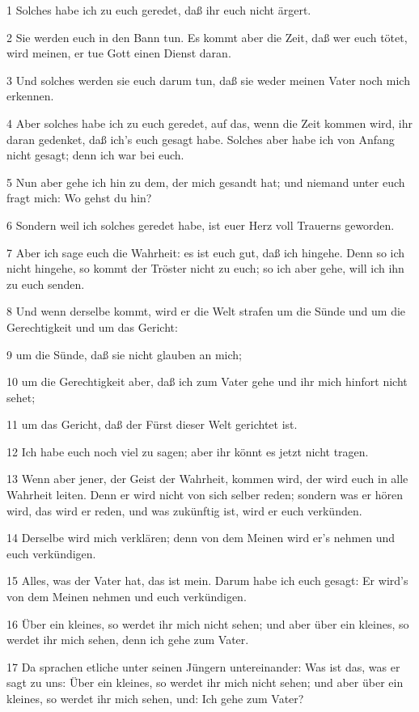 \par 1 Solches habe ich zu euch geredet, daß ihr euch nicht ärgert.
\par 2 Sie werden euch in den Bann tun. Es kommt aber die Zeit, daß wer euch tötet, wird meinen, er tue Gott einen Dienst daran.
\par 3 Und solches werden sie euch darum tun, daß sie weder meinen Vater noch mich erkennen.
\par 4 Aber solches habe ich zu euch geredet, auf das, wenn die Zeit kommen wird, ihr daran gedenket, daß ich's euch gesagt habe. Solches aber habe ich von Anfang nicht gesagt; denn ich war bei euch.
\par 5 Nun aber gehe ich hin zu dem, der mich gesandt hat; und niemand unter euch fragt mich: Wo gehst du hin?
\par 6 Sondern weil ich solches geredet habe, ist euer Herz voll Trauerns geworden.
\par 7 Aber ich sage euch die Wahrheit: es ist euch gut, daß ich hingehe. Denn so ich nicht hingehe, so kommt der Tröster nicht zu euch; so ich aber gehe, will ich ihn zu euch senden.
\par 8 Und wenn derselbe kommt, wird er die Welt strafen um die Sünde und um die Gerechtigkeit und um das Gericht:
\par 9 um die Sünde, daß sie nicht glauben an mich;
\par 10 um die Gerechtigkeit aber, daß ich zum Vater gehe und ihr mich hinfort nicht sehet;
\par 11 um das Gericht, daß der Fürst dieser Welt gerichtet ist.
\par 12 Ich habe euch noch viel zu sagen; aber ihr könnt es jetzt nicht tragen.
\par 13 Wenn aber jener, der Geist der Wahrheit, kommen wird, der wird euch in alle Wahrheit leiten. Denn er wird nicht von sich selber reden; sondern was er hören wird, das wird er reden, und was zukünftig ist, wird er euch verkünden.
\par 14 Derselbe wird mich verklären; denn von dem Meinen wird er's nehmen und euch verkündigen.
\par 15 Alles, was der Vater hat, das ist mein. Darum habe ich euch gesagt: Er wird's von dem Meinen nehmen und euch verkündigen.
\par 16 Über ein kleines, so werdet ihr mich nicht sehen; und aber über ein kleines, so werdet ihr mich sehen, denn ich gehe zum Vater.
\par 17 Da sprachen etliche unter seinen Jüngern untereinander: Was ist das, was er sagt zu uns: Über ein kleines, so werdet ihr mich nicht sehen; und aber über ein kleines, so werdet ihr mich sehen, und: Ich gehe zum Vater?

